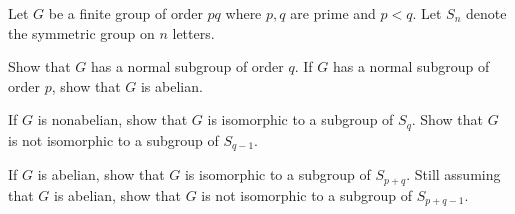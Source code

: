 Let $G$ be a finite group of order $pq$ where $p,q$ are prime and
$p<q$. Let $S_n$ denote the symmetric group on $n$ letters.
\begin{alist}
\item Show that $G$ has a normal subgroup of order $q$. If $G$ has a
normal subgroup of order $p$, show that $G$ is abelian.
\item If $G$ is nonabelian, show that $G$ is isomorphic to a subgroup
of $S_q$. Show that $G$ is not isomorphic to a subgroup of $S_{q-1}$.
\item If $G$ is abelian, show that $G$ is isomorphic to a subgroup of
$S_{p+q}$. Still assuming that $G$ is abelian, show that $G$ is not
isomorphic to a subgroup of $S_{p+q-1}$.
\end{alist}
